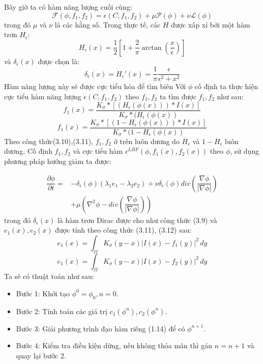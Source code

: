 \documentclass[12pt, oneside, a4paper]{book}
\begin{document}
Bây giờ ta có hàm năng lượng cuối cùng:
\begin{equation*}
\mathcal{F}(\phi,f_1,f_2)=\epsilon(C, f_1, f_2)+\mu \mathcal{P}(\phi)+\nu \mathcal{L}(\phi)
\end{equation*}
trong đó $\mu$ và $\nu$ là các hằng số. Trong thực tế, các $H$ được xấp xỉ bởi một hàm trơn $H_{\epsilon}$:
\begin{equation*}
H_{\epsilon}(x)=\dfrac{1}{2}\left[1+\dfrac{2}{\pi}\arctan(\dfrac{x}{\epsilon})\right]
\end{equation*}
và $\delta_{\epsilon}(x)$ được chọn là:
\begin{equation}
\delta_{\epsilon}(x)=H_{\epsilon}'(x)=\dfrac{1}{\pi}\dfrac{\epsilon}{\epsilon^2+x^2}
\end{equation}
Hàm năng lượng này sẽ được cực tiểu hóa để tìm biên 
Với $\phi$ cố định ta thực hiện cực tiểu hàm năng lượng $\epsilon(C, f_1, f_2)$  theo $f_1, f_2$ ta tìm được $f_1, f_2$ như sau:
\begin{equation}
f_1(x)=\dfrac{K_{\sigma}*[(H_{\epsilon}(\phi(x)))*I(x)]}{K_{\sigma}*(H_{\epsilon}(\phi(x))}
\end{equation}
\begin{equation}
f_1(x)=\dfrac{K_{\sigma}*[(1-H_{\epsilon}(\phi(x)))*I(x)]}{K_{\sigma}*(1-H_{\epsilon}(\phi(x))}
\end{equation}
Theo công thức(3.10),(3.11), $f_1, f_2$ ở trên luôn dương do $H_{\epsilon}$ và $1-H_{\epsilon}$ luôn dương. Cố định $f_1, f_2$ và cực tiểu hàm $\epsilon^{LBF}(\phi, f_1(x), f_2(x))$ theo $\phi$, sử dụng phương pháp hướng giảm ta được:

\begin{equation*}
\begin{split}
\dfrac{\partial \phi}{\partial t}=&- \delta_{\epsilon}(\phi)(\lambda_1 e_1 -\lambda_2 e_2)+\nu \delta_{\epsilon}(\phi)div(\dfrac{\nabla \phi}{|\nabla \phi|})\\
&+\mu(\nabla^2 \phi -div(\dfrac{\nabla \phi}{|\nabla \phi|}))
\end{split}
\end{equation*} 
trong đó $\delta_{\epsilon}(x)$ là hàm trơn Dirac được cho như công thức (3.9) và $e_1(x), e_2(x)$ được tính theo công thức (3.11), (3.12) sau:
\begin{equation}
e_1(x)=\int_{\Omega}K_{\sigma}(y-x)|I(x)-f_1(y)|^2 \,dy
\end{equation}
\begin{equation}
e_1(x)=\int_{\Omega}K_{\sigma}(y-x)|I(x)-f_2(y)|^2 \,dy
\end{equation}
Ta sẽ có thuật toán như sau:
\begin{itemize}
\item Bước 1: Khởi tạo $\phi^0=\phi_0, n=0$.
\item Bước 2: Tính toán các giá trị $c_1(\phi^n), c_2(\phi^n)$.
\item Bước 3: Giải phương trình đạo hàm riêng (1.14) để có $\phi^{n+1}$.
\item Bước 4: Kiểm tra điều kiện dừng, nếu không thỏa mãn thì gán $n=n+1$ và quay lại bước 2.
\end{itemize}
\end{document}
